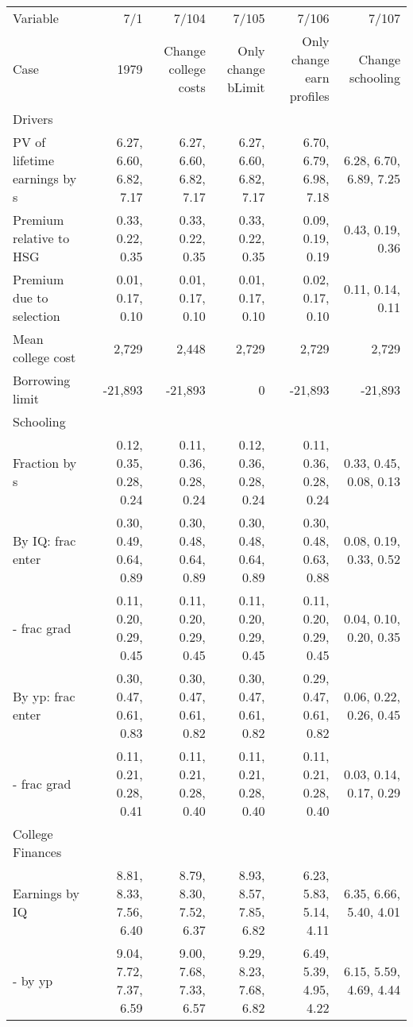 \begin{tabular}{lrrrrr}
\hline
Variable & 7/1  & 7/104  & 7/105  & 7/106  & 7/107  \\ 
Case & 1979  & Change college costs  & Only change bLimit  & Only change earn profiles  & Change schooling  \\ 
Drivers &   &   &   &   &   \\ 
PV of lifetime earnings by s & 6.27, 6.60, 6.82, 7.17  & 6.27, 6.60, 6.82, 7.17  & 6.27, 6.60, 6.82, 7.17  & 6.70, 6.79, 6.98, 7.18  & 6.28, 6.70, 6.89, 7.25  \\ 
Premium relative to HSG & 0.33, 0.22, 0.35  & 0.33, 0.22, 0.35  & 0.33, 0.22, 0.35  & 0.09, 0.19, 0.19  & 0.43, 0.19, 0.36  \\ 
Premium due to selection & 0.01, 0.17, 0.10  & 0.01, 0.17, 0.10  & 0.01, 0.17, 0.10  & 0.02, 0.17, 0.10  & 0.11, 0.14, 0.11  \\ 
Mean college cost & 2,729  & 2,448  & 2,729  & 2,729  & 2,729  \\ 
Borrowing limit & -21,893  & -21,893  & 0  & -21,893  & -21,893  \\ 
\hline
Schooling &   &   &   &   &   \\ 
Fraction by s & 0.12, 0.35, 0.28, 0.24  & 0.11, 0.36, 0.28, 0.24  & 0.12, 0.36, 0.28, 0.24  & 0.11, 0.36, 0.28, 0.24  & 0.33, 0.45, 0.08, 0.13  \\ 
By IQ: frac enter & 0.30, 0.49, 0.64, 0.89  & 0.30, 0.48, 0.64, 0.89  & 0.30, 0.48, 0.64, 0.89  & 0.30, 0.48, 0.63, 0.88  & 0.08, 0.19, 0.33, 0.52  \\ 
- frac grad & 0.11, 0.20, 0.29, 0.45  & 0.11, 0.20, 0.29, 0.45  & 0.11, 0.20, 0.29, 0.45  & 0.11, 0.20, 0.29, 0.45  & 0.04, 0.10, 0.20, 0.35  \\ 
By yp: frac enter & 0.30, 0.47, 0.61, 0.83  & 0.30, 0.47, 0.61, 0.82  & 0.30, 0.47, 0.61, 0.82  & 0.29, 0.47, 0.61, 0.82  & 0.06, 0.22, 0.26, 0.45  \\ 
- frac grad & 0.11, 0.21, 0.28, 0.41  & 0.11, 0.21, 0.28, 0.40  & 0.11, 0.21, 0.28, 0.40  & 0.11, 0.21, 0.28, 0.40  & 0.03, 0.14, 0.17, 0.29  \\ 
\hline
College Finances &   &   &   &   &   \\ 
Earnings by IQ & 8.81, 8.33, 7.56, 6.40  & 8.79, 8.30, 7.52, 6.37  & 8.93, 8.57, 7.85, 6.82  & 6.23, 5.83, 5.14, 4.11  & 6.35, 6.66, 5.40, 4.01  \\ 
- by yp & 9.04, 7.72, 7.37, 6.59  & 9.00, 7.68, 7.33, 6.57  & 9.29, 8.23, 7.68, 6.82  & 6.49, 5.39, 4.95, 4.22  & 6.15, 5.59, 4.69, 4.44  \\ 

\end{tabular}
